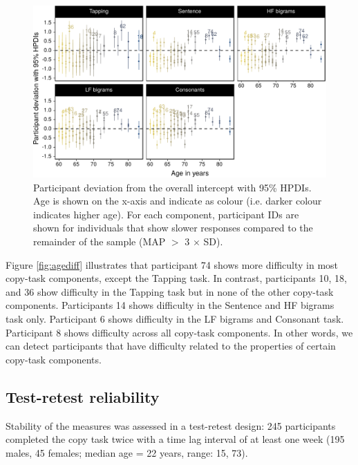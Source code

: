\documentclass[,man,floatsintext]{apa6}
\begin{document}
\begin{figure}[!h]

{\centering \includegraphics{ct_files/figure-latex/unnamed-chunk-9-1} 

}

\caption{\label{fig:agediff}Participant deviation from the overall intercept with 95\% HPDIs. Age is shown on the x-axis and indicate as colour (i.e. darker colour indicates higher age). For each component, participant IDs are shown for individuals that show slower responses compared to the remainder of the sample (MAP $>$ 3 $\times$ SD).}\label{fig:unnamed-chunk-9}
\end{figure}

Figure \ref{fig:agediff} illustrates that participant 74 shows more difficulty in most copy-task components, except the Tapping task. In contrast, participants 10, 18, and 36 show difficulty in the Tapping task but in none of the other copy-task components. Participants 14 shows difficulty in the Sentence and HF bigrams task only. Participant 6 shows difficulty in the LF bigrams and Consonant task. Participant 8 shows difficulty across all copy-task components. In other words, we can detect participants that have difficulty related to the properties of certain copy-task components.

\hypertarget{test-retest-reliability}{%
\subsection{Test-retest reliability}\label{test-retest-reliability}}

Stability of the measures was assessed in a test-retest design: 245 participants completed the copy task twice with a time lag interval of at least one week (195 males, 45 females; median age = 22 years, range: 15, 73).
\end{document}
